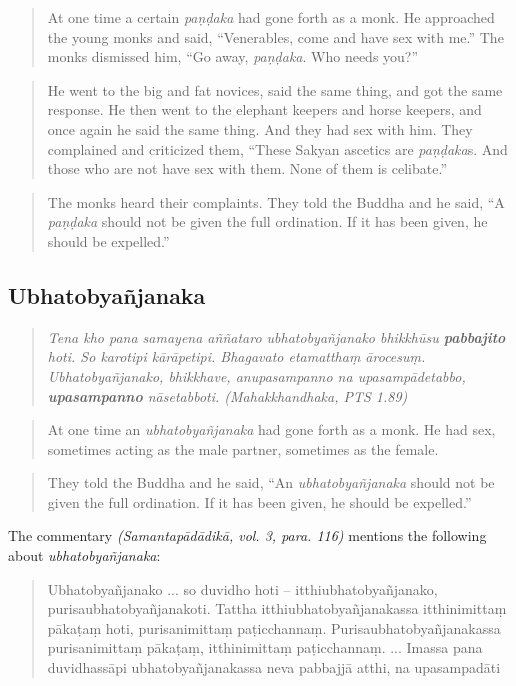 \medskip

\begin{quote}
At one time a certain {\em paṇḍaka} had gone forth as a monk. He approached the young monks and said, “Venerables, come and have sex with me.”
The monks dismissed him, “Go away, {\em paṇḍaka}. Who needs you?”
\end{quote}
\begin{quote}
He went to the big and fat novices, said the same thing, and got the same response.
He then went to the elephant keepers and horse keepers, and once again he said the same thing. And they had sex with him. They complained and criticized them, “These Sakyan ascetics are {\em paṇḍaka}s. And those who are not have sex with them. None of them is celibate.”
\end{quote}
\begin{quote}
The monks heard their complaints. They told the Buddha and he said, “A {\em paṇḍaka} should not be given the full ordination. If it has been given, he should be expelled.”
\end{quote}



\subsection{Ubhatob­yañ­janaka}

\begin{quote}
{\em Tena kho pana samayena aññataro ubhatobyañjanako bhikkhūsu \textbf{pabbajito} hoti. So karotipi kārāpetipi. Bhagavato etamatthaṃ ārocesuṃ. Ubhatobyañjanako, bhikkhave, anupasampanno na upasampādetabbo, \textbf{upasampanno} nāsetabboti. (Mahakkhandhaka, PTS 1.89)}
\end{quote}

\medskip

\begin{quote}
At one time an {\em ubhatob­yañ­janaka} had gone forth as a monk. He had sex, sometimes acting as the male partner, sometimes as the female.
\end{quote}
\begin{quote}
They told the Buddha and he said, “An {\em ubhatob­yañ­janaka} should not be given the full ordination. If it has been given, he should be expelled.”
\end{quote}

The commentary {\em (Samantapādādikā, vol. 3, para. 116)} mentions the following about {\em ubhatob­yañ­janaka}:

\begin{quote}
Ubhatobyañjanako ... so duvidho hoti – itthiubhatobyañjanako, purisaubhatobyañjanakoti. Tattha itthiubhatobyañjanakassa itthinimittaṃ pākaṭaṃ hoti, purisanimittaṃ paṭicchannaṃ. Purisaubhatobyañjanakassa purisanimittaṃ pākaṭaṃ, itthinimittaṃ paṭicchannaṃ. ... Imassa pana duvidhassāpi ubhatobyañjanakassa neva pabbajjā atthi, na upasampadāti
\end{quote}

